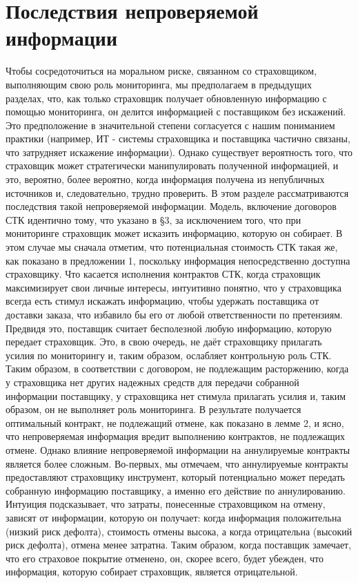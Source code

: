 \documentclass[a4paper,12pt]{article}
\begin{document}
\section{Последствия непроверяемой информации}
Чтобы сосредоточиться на моральном риске, связанном со страховщиком, выполняющим свою роль мониторинга, мы предполагаем в предыдущих разделах, что, как только страховщик получает обновленную информацию с помощью мониторинга, он делится информацией с поставщиком без искажений. Это предположение в значительной степени согласуется с нашим пониманием практики (например, ИТ - системы страховщика и поставщика частично связаны, что затрудняет искажение информации). Однако существует вероятность того, что страховщик может стратегически манипулировать полученной информацией, и это, вероятно, более вероятно, когда информация получена из непубличных источников и, следовательно, трудно проверить. В этом разделе рассматриваются последствия такой непроверяемой информации. Модель, включение договоров СТК идентично тому, что указано в §3, за исключением того, что при мониторинге страховщик может исказить информацию, которую он собирает.
В этом случае мы сначала отметим, что потенциальная стоимость СТК такая же, как показано в предложении 1, поскольку информация непосредственно доступна страховщику. Что касается исполнения контрактов СТК, когда страховщик максимизирует свои личные интересы, интуитивно понятно, что у страховщика всегда есть стимул искажать информацию, чтобы удержать поставщика от доставки заказа, что избавило бы его от любой ответственности по претензиям. Предвидя это, поставщик считает бесполезной любую информацию, которую передает страховщик. Это, в свою очередь, не даёт страховщику прилагать усилия по мониторингу и, таким образом, ослабляет контрольную роль СТК. Таким образом, в соответствии с договором, не подлежащим расторжению, когда у страховщика нет других надежных средств для передачи собранной информации поставщику, у страховщика нет стимула прилагать усилия и, таким образом, он не выполняет роль мониторинга. В результате получается оптимальный контракт, не подлежащий отмене, как показано в лемме 2, и ясно, что непроверяемая информация вредит выполнению контрактов, не подлежащих отмене.
Однако влияние непроверяемой информации на аннулируемые контракты является более сложным. Во-первых, мы отмечаем, что аннулируемые контракты предоставляют страховщику инструмент, который потенциально может передать собранную информацию поставщику, а именно его действие по аннулированию. Интуиция подсказывает, что затраты, понесенные страховщиком на отмену, зависят от информации, которую он получает: когда информация положительна (низкий риск дефолта), стоимость отмены высока, а когда отрицательна (высокий риск дефолта), отмена менее затратна. Таким образом, когда поставщик замечает, что его страховое покрытие отменено, он, скорее всего, будет убежден, что информация, которую собирает страховщик, является отрицательной.
\end{document}
